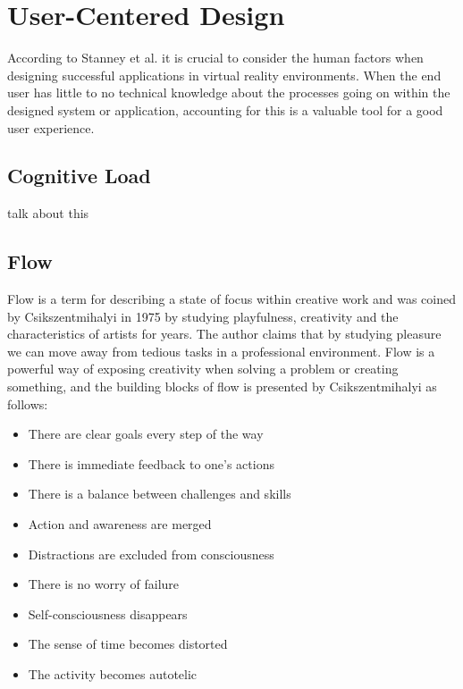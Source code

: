 \section{User-Centered Design}
\label{theory:user-centered}
According to Stanney et al. it is crucial to consider the human factors when designing successful applications in virtual reality environments. When the end user has little to no technical knowledge about the processes going on within the designed system or application, accounting for this is a valuable tool for a good user experience.
\cite{UCD:stanney1998human}
\subsection{Cognitive Load}
talk about this
\subsection{Flow}
\label{theory:user-centered:flow}
Flow is a term for describing a state of focus within creative work and was coined by Csikszentmihalyi in 1975 by studying playfulness, creativity and the characteristics of artists for years. \cite{UCD:boredom1975anxiety} The author claims that by studying pleasure we can move away from tedious tasks in a professional environment. Flow is a powerful way of exposing creativity when solving a problem or creating something, and the building blocks of flow is presented by Csikszentmihalyi as follows:\cite{UCD:csikszentmihalyi1996flow}

\begin{itemize}
  \item There are clear goals every step of the way
  \item There is immediate feedback to one's actions
  \item There is a balance between challenges and skills
  \item Action and awareness are merged
  \item Distractions are excluded from consciousness
  \item There is no worry of failure
  \item Self-consciousness disappears
  \item The sense of time becomes distorted
  \item The activity becomes autotelic
\end{itemize}
